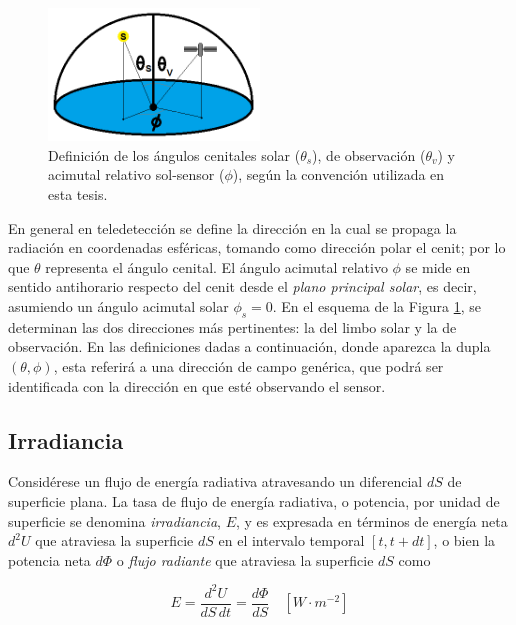         \begin{figure}
        \centering
        \includegraphics[width=0.5\textwidth]{int/figures/obs_ilum}
        \caption[Ángulos geométricos de observación-iluminación.]{Definición de los ángulos cenitales solar ($\theta_{s}$), de observación ($\theta_{v}$) y acimutal relativo sol-sensor ($\phi$), según la convención utilizada en esta tesis.}
        \label{int:obs_ilum}
        \end{figure}
    
        En general en teledetección se define la dirección en la cual se propaga la radiación en coordenadas esféricas, tomando como dirección polar el cenit; por lo que $\theta$ representa el ángulo cenital. El ángulo acimutal relativo $\phi$ se mide en sentido antihorario respecto del cenit desde el \textit{plano principal solar}, es decir, asumiendo un ángulo acimutal solar $\phi_{s}=0$. En el esquema de la Figura \ref{int:obs_ilum}, se determinan las dos direcciones más pertinentes: la del limbo solar y la de observación. En las definiciones dadas a continuación, donde aparezca la dupla $(\theta,\phi)$, esta referirá a una dirección de campo genérica, que podrá ser identificada con la dirección en que esté observando el sensor.

	\subsection{Irradiancia}
    \label{int:s:irradiancia}
        Considérese un flujo de energía radiativa atravesando un diferencial $dS$ de superficie plana. La tasa de flujo de energía radiativa, o potencia, por unidad de superficie se denomina \textit{irradiancia}, $E$, y es expresada en términos de energía neta $d^{2}U$ que atraviesa la superficie $dS$ en el intervalo temporal $[t,t+dt]$, o bien la potencia neta $d\Phi$ o \textit{flujo radiante} que atraviesa la superficie $dS$ como

        \begin{equation}
         E=\frac{d^{2} U}{dS\,dt}=\frac{d\Phi}{dS}\quad [W \cdot m^{-2}]
        \label{int:eq:irradiancia}
        \end{equation}

